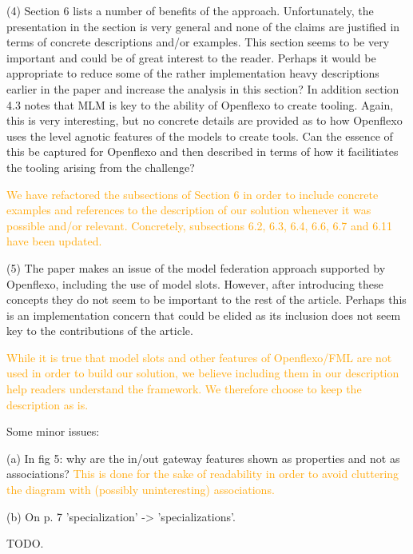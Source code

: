 \documentclass[10pt]{article}
\begin{document}
\begin{response}{(4) Section 6 lists a number of benefits of the approach. Unfortunately, the presentation in the section is very general and none of the claims are justified in terms of concrete descriptions and/or examples. This section seems to be very important and could be of great interest to the reader. Perhaps it would be appropriate to reduce some of the rather implementation heavy descriptions earlier in the paper and increase the analysis in this section? In addition section 4.3 notes that MLM is key to the ability of Openflexo to create tooling. Again, this is very interesting, but no concrete details are provided as to how Openflexo uses the level agnotic features of the models to create tools. Can the essence of this be captured for Openflexo and then described in terms of how it facilitiates the tooling arising from the challenge?}

\textcolor{orange}{We have refactored the subsections of Section 6 in order to include concrete examples and references to the description of our solution whenever it was possible and/or relevant. Concretely, subsections 6.2, 6.3, 6.4, 6.6, 6.7 and 6.11 have been updated.}


\end{response}

\begin{response}{(5) The paper makes an issue of the model federation approach supported by Openflexo, including the use of model slots. However, after introducing these concepts they do not seem to be important to the rest of the article. Perhaps this is an implementation concern that could be elided as its inclusion does not seem key to the contributions of the article. } 

\textcolor{orange}{While it is true that model slots and other features of Openflexo/FML are not used in order to build our solution,  we believe including them in our description help readers understand the framework. We therefore choose to keep the description as is.}
\end{response}

\begin{response}{Some minor issues:

(a) In fig 5: why are the in/out gateway features shown as properties and not as associations? \textcolor{orange}{This is done for the sake of readability in order to avoid cluttering the diagram with (possibly uninteresting) associations.}

(b) On p. 7 'specialization' -> 'specializations'.} 
TODO.
\end{response}
\end{document}
